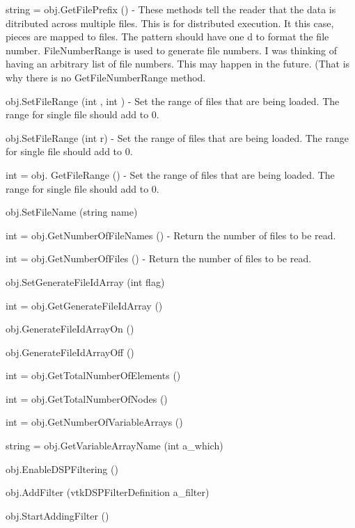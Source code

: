 \begin{DoxyItemize}
\item {\ttfamily string = obj.\-Get\-File\-Prefix ()} -\/ These methods tell the reader that the data is ditributed across multiple files. This is for distributed execution. It this case, pieces are mapped to files. The pattern should have one d to format the file number. File\-Number\-Range is used to generate file numbers. I was thinking of having an arbitrary list of file numbers. This may happen in the future. (That is why there is no Get\-File\-Number\-Range method.  
\item {\ttfamily obj.\-Set\-File\-Range (int , int )} -\/ Set the range of files that are being loaded. The range for single file should add to 0.  
\item {\ttfamily obj.\-Set\-File\-Range (int r)} -\/ Set the range of files that are being loaded. The range for single file should add to 0.  
\item {\ttfamily int = obj. Get\-File\-Range ()} -\/ Set the range of files that are being loaded. The range for single file should add to 0.  
\item {\ttfamily obj.\-Set\-File\-Name (string name)}  
\item {\ttfamily int = obj.\-Get\-Number\-Of\-File\-Names ()} -\/ Return the number of files to be read.  
\item {\ttfamily int = obj.\-Get\-Number\-Of\-Files ()} -\/ Return the number of files to be read.  
\item {\ttfamily obj.\-Set\-Generate\-File\-Id\-Array (int flag)}  
\item {\ttfamily int = obj.\-Get\-Generate\-File\-Id\-Array ()}  
\item {\ttfamily obj.\-Generate\-File\-Id\-Array\-On ()}  
\item {\ttfamily obj.\-Generate\-File\-Id\-Array\-Off ()}  
\item {\ttfamily int = obj.\-Get\-Total\-Number\-Of\-Elements ()}  
\item {\ttfamily int = obj.\-Get\-Total\-Number\-Of\-Nodes ()}  
\item {\ttfamily int = obj.\-Get\-Number\-Of\-Variable\-Arrays ()}  
\item {\ttfamily string = obj.\-Get\-Variable\-Array\-Name (int a\-\_\-which)}  
\item {\ttfamily obj.\-Enable\-D\-S\-P\-Filtering ()}  
\item {\ttfamily obj.\-Add\-Filter (vtk\-D\-S\-P\-Filter\-Definition a\-\_\-filter)}  
\item {\ttfamily obj.\-Start\-Adding\-Filter ()}  

\end{DoxyItemize}
